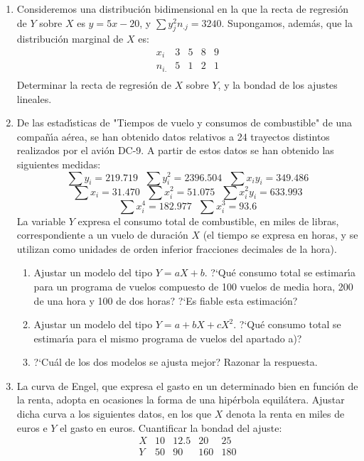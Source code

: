 \documentclass[11pt]{book}
\begin{document}
\begin{enumerate}
\item Consideremos una distribuci{\'o}n bidimensional en la que la recta de regresi{\'o}n de $Y$ sobre $X$ es
$y=5x-20$, y $\sum y_{j}^{2} n_{.j} =3240$. Supongamos, adem{\'a}s, que la distribuci{\'o}n marginal de $X$
es:
   $$ \begin{array}{c|cccc}
       x_i   &  3 & 5 & 8 & 9 \\ \hline
        n_{i.} &  5 & 1 & 2 & 1 \\
    \end{array}$$
Determinar la recta de regresi{\'o}n de $X$ sobre $Y$, y la bondad  de los ajustes lineales.


\item De las estad{\'\i}sticas de "Tiempos de vuelo y consumos de
combustible"  de una compa{\~n}{\'\i}a a{\'e}rea, se han  obtenido  datos relativos  a  24  trayectos distintos
realizados por el avi{\'o}n DC-9. A partir de estos datos se han obtenido las siguientes medidas:
$$
\sum y_i =219\mbox{.}719 \ \ \    \sum y_{i}^{2} =2396\mbox{.}504  \ \ \   \sum
x_i y_i =349\mbox{.}486
$$
$$
\sum x_i =31\mbox{.}470  \ \ \    \sum x_{i}^{2} =51\mbox{.}075   \ \ \    \sum
x_{i}^{2} y_i =633\mbox{.}993
$$
$$
\sum x_{i}^{4} =182\mbox{.}977 \ \ \    \sum x_{i}^{3} =93\mbox{.}6
$$
   La variable $Y$ expresa el consumo  total  de  combustible,  en  miles  de
   libras, correspondiente a un vuelo de  duraci{\'o}n  $X$ (el tiempo  se
   expresa en  horas,  y  se  utilizan  como  unidades  de  orden  inferior
   fracciones decimales de la hora).

  \begin{enumerate}
     \item Ajustar un modelo del tipo $Y=aX+b$.  ?`Qu{\'e} consumo total se estimar{\'\i}a  para un
                programa de vuelos compuesto de 100 vuelos de media hora,
                200 de una hora y 100 de dos horas? ?`Es fiable esta
                estimaci{\'o}n?

      \item Ajustar un modelo del tipo  $Y=a+bX+cX^{2}$.
?`Qu{\'e} consumo total se estimar{\'\i}a para el mismo
                  programa de vuelos del apartado a)?
\item ?`Cu{\'a}l de los dos modelos se ajusta mejor? Razonar la respuesta. \end{enumerate}


\item La curva de Engel, que expresa el gasto en un determinado bien en funci\'on de la renta,
adopta en ocasiones la forma de una hip\'erbola equil\'atera. Ajustar dicha curva a los siguientes
datos, en los que $X$ denota la renta en miles de euros e $Y$ el gasto en euros. Cuantificar la
bondad del ajuste:$$
    \begin{array}{c|cccc}
      X &  10  & 12\mbox{.}5 &  20  & 25 \\ \hline
      Y &  50  &  90  &  160 & 180  \\
    \end{array}
$$


\end{enumerate}
\end{document}
